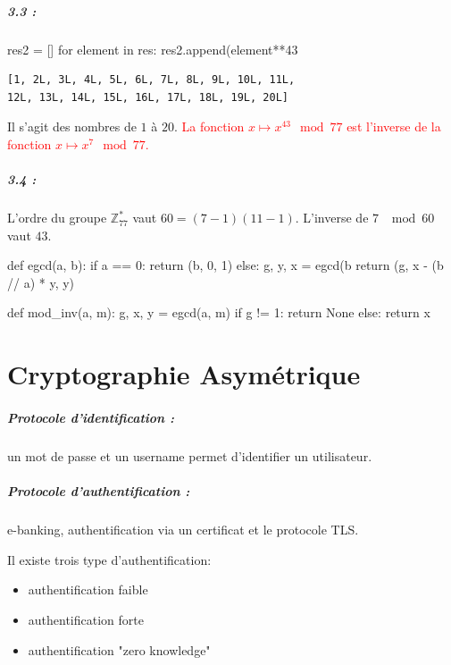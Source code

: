 \documentclass[11pt,a4paper]{report}
\begin{document}
\paragraph*{3.3 : }
\begin{pythoncode}
res2 = []
for element in res:
    res2.append(element**43 %
\end{pythoncode}
\begin{verbatim}
[1, 2L, 3L, 4L, 5L, 6L, 7L, 8L, 9L, 10L, 11L, 
12L, 13L, 14L, 15L, 16L, 17L, 18L, 19L, 20L]
\end{verbatim}

Il s'agit des nombres de $1$ à $20$. \textcolor{red}{La fonction $x\mapsto x^43 \mod 77$ est l'inverse de la fonction $x\mapsto x^7 \mod 77$.}

\paragraph*{3.4 : } L'ordre du groupe $\mathbb{Z}^*_{77}$ vaut $60 = (7-1)(11-1)$. L'inverse de $7$ $\mod 60$ vaut $43$.

\begin{pythoncode}
def egcd(a, b):
    if a == 0:
        return (b, 0, 1)
    else:
        g, y, x = egcd(b %
        return (g, x - (b // a) * y, y)


def mod_inv(a, m):
    g, x, y = egcd(a, m)
    if g != 1:
        return None
    else:
        return x %
\end{pythoncode}

\chapter{Cryptographie Asymétrique}

\paragraph*{Protocole d'identification : } un mot de passe et un username permet d'identifier un uti\-lisateur.

\paragraph*{Protocole d'authentification : } e-banking, authentification via un certificat et le protocole TLS.

Il existe trois type d'authentification:
\begin{itemize}
    \item authentification faible
    \item authentification forte
    \item authentification "zero knowledge"
\end{itemize}
\end{document}
